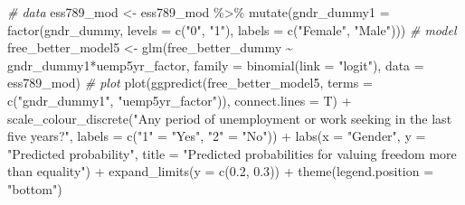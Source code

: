 \documentclass[
]{article}
\newenvironment{Shaded}{\begin{snugshade}}{\end{snugshade}}
\newcommand{\AttributeTok}[1]{\textcolor[rgb]{0.77,0.63,0.00}{#1}}
\newcommand{\CommentTok}[1]{\textcolor[rgb]{0.56,0.35,0.01}{\textit{#1}}}
\newcommand{\FloatTok}[1]{\textcolor[rgb]{0.00,0.00,0.81}{#1}}
\newcommand{\FunctionTok}[1]{\textcolor[rgb]{0.00,0.00,0.00}{#1}}
\newcommand{\NormalTok}[1]{#1}
\newcommand{\OtherTok}[1]{\textcolor[rgb]{0.56,0.35,0.01}{#1}}
\newcommand{\SpecialCharTok}[1]{\textcolor[rgb]{0.00,0.00,0.00}{#1}}
\newcommand{\StringTok}[1]{\textcolor[rgb]{0.31,0.60,0.02}{#1}}
\begin{document}
\begin{Shaded}
\begin{Highlighting}[]
\CommentTok{\# data }
\NormalTok{ess789\_mod }\OtherTok{\textless{}{-}}\NormalTok{ ess789\_mod }\SpecialCharTok{\%\textgreater{}\%}
  \FunctionTok{mutate}\NormalTok{(}\AttributeTok{gndr\_dummy1 =} \FunctionTok{factor}\NormalTok{(gndr\_dummy, }\AttributeTok{levels =} \FunctionTok{c}\NormalTok{(}\StringTok{"0"}\NormalTok{, }\StringTok{"1"}\NormalTok{), }
                             \AttributeTok{labels =} \FunctionTok{c}\NormalTok{(}\StringTok{"Female"}\NormalTok{, }\StringTok{"Male"}\NormalTok{)))}
\CommentTok{\# model }
\NormalTok{free\_better\_model5 }\OtherTok{\textless{}{-}} \FunctionTok{glm}\NormalTok{(free\_better\_dummy }\SpecialCharTok{\textasciitilde{}}\NormalTok{ gndr\_dummy1}\SpecialCharTok{*}\NormalTok{uemp5yr\_factor,}
                         \AttributeTok{family =} \FunctionTok{binomial}\NormalTok{(}\AttributeTok{link =} \StringTok{"logit"}\NormalTok{),}
                         \AttributeTok{data =}\NormalTok{ ess789\_mod)}
\CommentTok{\# plot }
\FunctionTok{plot}\NormalTok{(}\FunctionTok{ggpredict}\NormalTok{(free\_better\_model5, }\AttributeTok{terms =} \FunctionTok{c}\NormalTok{(}\StringTok{"gndr\_dummy1"}\NormalTok{, }\StringTok{"uemp5yr\_factor"}\NormalTok{)),}
     \AttributeTok{connect.lines =}\NormalTok{ T) }\SpecialCharTok{+}
  \FunctionTok{scale\_colour\_discrete}\NormalTok{(}\StringTok{"Any period of unemployment or work seeking in the last five years?"}\NormalTok{,}
                        \AttributeTok{labels =} \FunctionTok{c}\NormalTok{(}\StringTok{"1"} \OtherTok{=} \StringTok{"Yes"}\NormalTok{,}
                                   \StringTok{"2"} \OtherTok{=} \StringTok{"No"}\NormalTok{)) }\SpecialCharTok{+}
  \FunctionTok{labs}\NormalTok{(}\AttributeTok{x =} \StringTok{"Gender"}\NormalTok{, }\AttributeTok{y =} \StringTok{"Predicted probability"}\NormalTok{, }
       \AttributeTok{title =} \StringTok{"Predicted probabilities for valuing freedom more than equality"}\NormalTok{) }\SpecialCharTok{+}
  \FunctionTok{expand\_limits}\NormalTok{(}\AttributeTok{y =} \FunctionTok{c}\NormalTok{(}\FloatTok{0.2}\NormalTok{, }\FloatTok{0.3}\NormalTok{)) }\SpecialCharTok{+}
  \FunctionTok{theme}\NormalTok{(}\AttributeTok{legend.position =} \StringTok{"bottom"}\NormalTok{)}
\end{Highlighting}
\end{Shaded}
\end{document}

